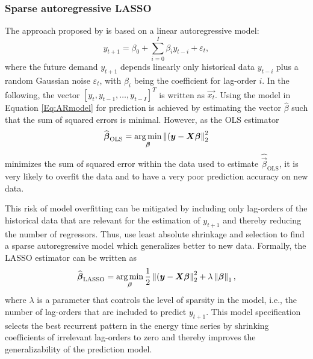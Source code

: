 \subsubsection{Sparse autoregressive LASSO}

The approach proposed by \citet{Li:2017} is based on a linear autoregressive model:
%
\begin{equation} \label{Eq:ARmodel}
    y_{t+1}=\beta_0+\sum_{i=0}^I\beta_iy_{t-i}+\varepsilon_t,
\end{equation}
%
where the future demand $y_{t+1}$ depends linearly only historical data $y_{t-i}$ plus a random Gaussian noise $\varepsilon_t$, with $\beta_i$ being the coefficient for lag-order $i$. In the following, the vector $\left[y_t, y_{t-1}, \dots, y_{t-I}\right]^T$ is written as $\vec{x_t}$. Using the model in Equation \ref{Eq:ARmodel} for prediction is achieved by estimating the vector $\widehat{\beta}$ such that the sum of squared errors is minimal. However, as the OLS estimator
%
\begin{equation} \label{Eq:betaOLS}
    \widehat{\boldsymbol{\beta}}_{\text{OLS}}=\operatorname*{\arg\min}_{\boldsymbol{\beta}}\left\lVert(\boldsymbol{y}-\boldsymbol{X}\boldsymbol{\beta}\right\rVert^2_2
\end{equation}
%
minimizes the sum of squared error within the data used to estimate $\widehat{\vec{\beta}}_{\text{OLS}}$, it is very likely to overfit the data and to have a very poor prediction accuracy on new data.

This risk of model overfitting can be mitigated by including only lag-orders of the historical data that are relevant for the estimation of $y_{t+1}$ and thereby reducing the number of regressors. Thus, \citet{Li:2017} use least absolute shrinkage and selection to find a sparse autoregressive model which generalizes better to new data. Formally, the LASSO estimator can be written as
%
\begin{equation} \label{betaLASSO}
    \widehat{\boldsymbol{\beta}}_{\text{LASSO}}=\operatorname*{\arg\min}_{\boldsymbol{\beta}}\frac{1}{2}\left\lVert(\boldsymbol{y}-\boldsymbol{X}\boldsymbol{\beta}\right\rVert^2_2+\lambda\left\lVert\boldsymbol{\beta}\right\rVert_1,
\end{equation}
%
where $\lambda$ is a parameter that controls the level of sparsity in the model, i.e., the number of lag-orders that are included to predict $y_{t+1}$. This model specification selects the best recurrent pattern in the energy time series by shrinking coefficients of irrelevant lag-orders to zero and thereby improves the generalizability of the prediction model.



